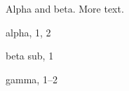 \documentclass{article}
\begin{document}
Alpha and beta.
\newpage
More text.
\begin{theindex}
\item alpha, 1, 2
\item beta
  \subitem sub, 1
\indexspace
\item gamma, 1--2
\end{theindex}
\end{document}
